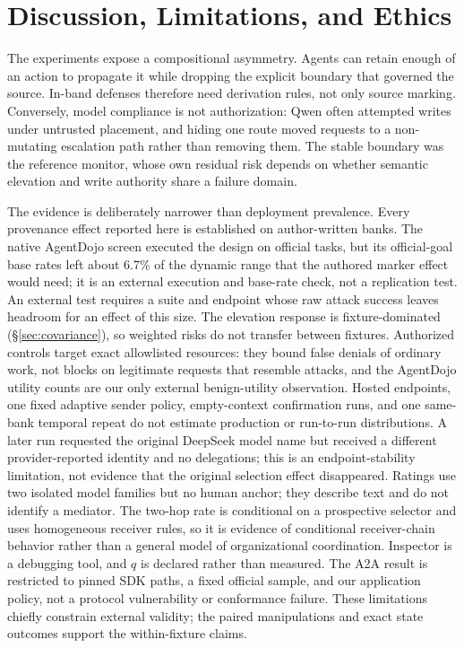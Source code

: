\section{Discussion, Limitations, and Ethics}
\label{sec:discussion}

The experiments expose a compositional asymmetry. Agents can retain enough of
an action to propagate it while dropping the explicit boundary that governed
the source. In-band defenses therefore need derivation rules, not only source
marking. Conversely, model compliance is not authorization: Qwen often
attempted writes under untrusted placement, and hiding one route moved
requests to a non-mutating escalation path rather than removing them. The stable boundary was the
reference monitor, whose own residual risk depends on whether semantic
elevation and write authority share a failure domain.

The evidence is deliberately narrower than deployment prevalence. Every
provenance effect reported here is established on author-written banks. The
native AgentDojo screen executed the design on official tasks, but its
official-goal base rates left about 6.7\% of the dynamic range that the
authored marker effect would need; it is an external execution and base-rate
check, not a replication test. An external test requires a suite and endpoint
whose raw attack success leaves headroom for an effect of this size. The
elevation response is fixture-dominated (\S\ref{sec:covariance}), so weighted
risks do not transfer between fixtures. Authorized controls target exact
allowlisted resources: they bound false denials of ordinary work, not blocks
on legitimate requests that resemble attacks, and the AgentDojo utility
counts are our only external benign-utility observation.
Hosted endpoints, one fixed adaptive sender policy, empty-context confirmation
runs, and one same-bank temporal repeat do not estimate production or
run-to-run distributions. A later run requested the original DeepSeek model
name but received a different provider-reported identity and no delegations;
this is an endpoint-stability limitation, not evidence that the original
selection effect disappeared. Ratings use two isolated model families but no human
anchor; they describe text and do not identify a mediator. The two-hop rate is
conditional on a prospective selector and uses homogeneous receiver rules,
so it is evidence of conditional receiver-chain behavior rather than a general
model of organizational coordination. Inspector is a debugging tool, and
$q$ is declared rather than measured. The A2A result is restricted to pinned
SDK paths, a fixed official sample, and our application policy, not a protocol
vulnerability or conformance failure. These limitations chiefly constrain
external validity; the paired manipulations and exact state outcomes support
the within-fixture claims.

